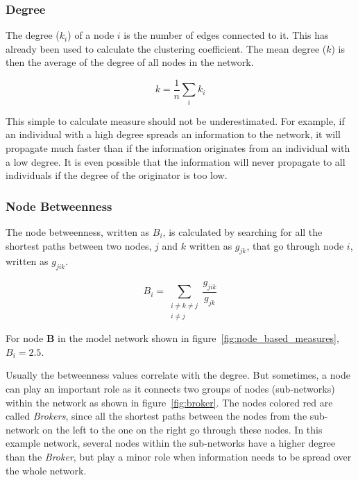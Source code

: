 \subsubsection{Degree}

The degree ($k_i$) of a node $i$ is the number of edges connected to it. This has already been used to calculate the clustering coefficient. The mean degree ($k$) is then the average of the degree of all nodes in the network.

\begin{equation}
k = \frac{1}{n}\sum_i k_i
\end{equation}

This simple to calculate measure should not be underestimated. For example, if an individual with a high degree spreads an information to the network, it will propagate much faster than if the information originates from an individual with a low degree. It is even possible that the information will never propagate to all individuals if the degree of the originator is too low.

\subsubsection{Node Betweenness}
\label{subsubsec:node_between}

The node betweenness, written as $B_i$, is calculated by searching for all the shortest paths between two nodes, $j$ and $k$ written as $g_{jk}$, that go through node $i$, written as $g_{jik}$.

\begin{equation}
B_i =	\sum_{
			\substack{i \neq k \neq j \\ i \neq j}
		}
		\frac{g_{jik}}{g_{jk}}
\end{equation}

For node \textbf{B} in the model network shown in figure~\ref{fig:node_based_measures}, $B_i = 2.5$.

Usually the betweenness values correlate with the degree. But sometimes, a node can play an important role as it connects two groups of nodes (sub-networks) within the network as shown in figure~\ref{fig:broker}. The nodes colored red are called \textit{Brokers}\citep{lusseau:04}, since all the shortest paths between the nodes from the sub-network on the left to the one on the right go through these nodes. In this example network, several nodes within the sub-networks have a higher degree than the \textit{Broker}, but play a minor role when information needs to be spread over the whole network.   

